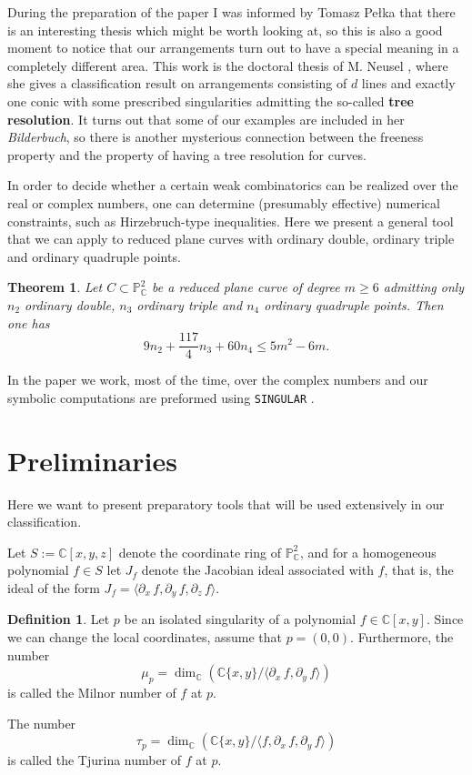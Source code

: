 \documentclass[12pt]{article}
\theoremstyle{plain}
\newtheorem{theorem}[thm]{Theorem}
\theoremstyle{definition}
\newtheorem{definition}[thm]{Definition}
\renewcommand\geq{\geqslant}
\renewcommand\leq{\leqslant}
\begin{document}
During the preparation of the paper I was informed by Tomasz Pe\l ka that there is an interesting thesis which might be worth looking at, so this is also a good moment to notice that our arrangements turn out to have a special meaning in a completely different area. This work is the doctoral thesis of M. Neusel \cite{neusel}, where she gives a classification result on arrangements consisting of $d$ lines and exactly one conic with some prescribed singularities admitting the so-called \textbf{tree resolution}. It turns out that some of our examples are included in her \textit{Bilderbuch}, so there is another mysterious connection between the freeness property and the property of having a tree resolution for curves.

In order to decide whether a certain weak combinatorics can be realized over the real or complex numbers, one can determine (presumably effective) numerical constraints, such as Hirzebruch-type inequalities. Here we present a general tool that we can apply to reduced plane curves with ordinary double, ordinary triple and ordinary quadruple points.
\begin{theorem}
\label{Hir}
Let $C \subset \mathbb{P}^{2}_{\mathbb{C}}$ be a reduced plane curve of degree $m\geq 6$ admitting only $n_{2}$ ordinary double, $n_{3}$ ordinary triple and $n_{4}$ ordinary quadruple points. Then one has
\begin{equation*}
9n_{2} + \frac{117}{4}n_{3} + 60n_{4} \leq 5m^{2}-6m.
\end{equation*}
\end{theorem}
In the paper we work, most of the time, over the complex numbers and our symbolic computations are preformed using \verb}SINGULAR} \cite{Singular}.

\section{Preliminaries}
Here we want to present preparatory tools that will be used extensively in our classification.

Let $S := \mathbb{C}[x,y,z]$ denote the coordinate ring of $\mathbb{P}^{2}_{\mathbb{C}}$, and for a homogeneous polynomial $f \in S$ let $J_{f}$ denote the Jacobian ideal associated with $f$, that is, the ideal of the form $J_{f} = \langle \partial_{x}\, f, \partial_{y} \, f, \partial_{z} \, f \rangle$.
\begin{definition}
Let $p$ be an isolated singularity of a polynomial $f\in \mathbb{C}[x,y]$. Since we can change the local coordinates, assume that $p=(0,0)$.
Furthermore, the number 
$$\mu_{p}=\dim_\mathbb{C}\left(\mathbb{C}\{x,y\} /\bigg\langle \partial_{x}\, f ,\partial_{y}\, f \bigg\rangle\right)$$
is called the Milnor number of $f$ at $p$.

The number
$$\tau_{p}=\dim_\mathbb{C}\left(\mathbb{C}\{x,y\}/\bigg\langle f, \partial_{x}\, f ,\partial_{y} \, f \bigg\rangle \right)$$
is called the Tjurina number of $f$ at $p$.
\end{definition}
\end{document}
